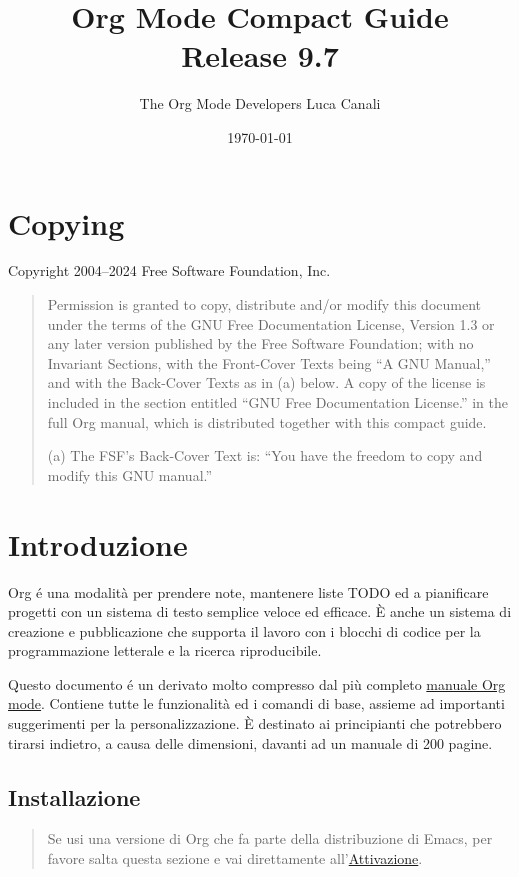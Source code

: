 \documentclass[11pt]{article}
\author{The Org Mode Developers Luca Canali}
\date{\today}
\title{Org Mode Compact Guide\\\medskip
\large Release 9.7}
\begin{document}
\maketitle
\tableofcontents


\section{Copying}
\label{sec:org41c2bc7}
Copyright \textcopyright{} 2004--2024  Free Software Foundation, Inc.

\begin{quote}
Permission is granted to copy, distribute and/or modify this document
under the terms of the GNU Free Documentation License, Version 1.3 or
any later version published by the Free Software Foundation; with no
Invariant Sections, with the Front-Cover Texts being ``A GNU Manual,''
and with the Back-Cover Texts as in (a) below.  A copy of the license
is included in the section entitled ``GNU Free Documentation License.''
in the full Org manual, which is distributed together with this
compact guide.

(a) The FSF's Back-Cover Text is: ``You have the freedom to copy and
modify this GNU manual.''
\end{quote}

\section{Introduzione}
\label{sec:orgad0e3b0}
Org é una modalità per prendere note, mantenere liste TODO ed a
pianificare progetti con un sistema di testo semplice veloce ed
efficace. È anche un sistema di creazione e pubblicazione che supporta
il lavoro con i blocchi di codice per la programmazione letterale e la
ricerca riproducibile.

Questo documento é un derivato molto compresso dal più completo
\href{https://www.gnu.org/software/emacs/manual/html\_mono/org.html\#Top}{manuale Org mode}. Contiene tutte le funzionalità ed i comandi di base,
assieme ad importanti suggerimenti per la personalizzazione. È
destinato ai principianti che potrebbero tirarsi indietro, a causa
delle dimensioni, davanti ad un manuale di 200 pagine.

\subsection*{Installazione}
\label{sec:org9bfcda8}
\begin{quote}
Se usi una versione di Org che fa parte della distribuzione di Emacs,
per favore salta questa sezione e vai direttamente all'\hyperref[sec:orgb24a1ce]{Attivazione}.
\end{quote}
\end{document}
